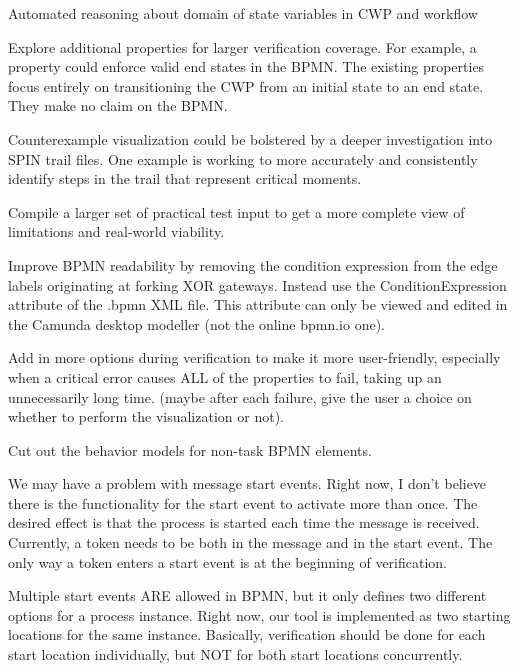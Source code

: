 Automated reasoning about domain of state variables in CWP and workflow

Explore additional properties for larger verification coverage. For example, a property could enforce valid end states in the BPMN. The existing properties focus entirely on transitioning the CWP from an initial state to an end state. They make no claim on the BPMN.

Counterexample visualization could be bolstered by a deeper investigation into SPIN trail files. One example is working to more accurately and consistently identify steps in the trail that represent critical moments.

Compile a larger set of practical test input to get a more complete view of limitations and real-world viability.

Improve BPMN readability by removing the condition expression from the edge labels originating at forking XOR gateways. Instead use the ConditionExpression attribute of the .bpmn XML file. This attribute can only be viewed and edited in the Camunda desktop modeller (not the online bpmn.io one).

Add in more options during verification to make it more user-friendly, especially when a critical error causes ALL of the properties to fail, taking up an unnecessarily long time. (maybe after each failure, give the user a choice on whether to perform the visualization or not).

Cut out the behavior models for non-task BPMN elements.

We may have a problem with message start events. Right now, I don't believe there is the functionality for the start event to activate more than once. The desired effect is that the process is started each time the message is received. Currently, a token needs to be both in the message and in the start event. The only way a token enters a start event is at the beginning of verification.

Multiple start events ARE allowed in BPMN, but it only defines two different options for a process instance. Right now, our tool is implemented as two starting locations for the same instance. Basically, verification should be done for each start location individually, but NOT for both start locations concurrently.